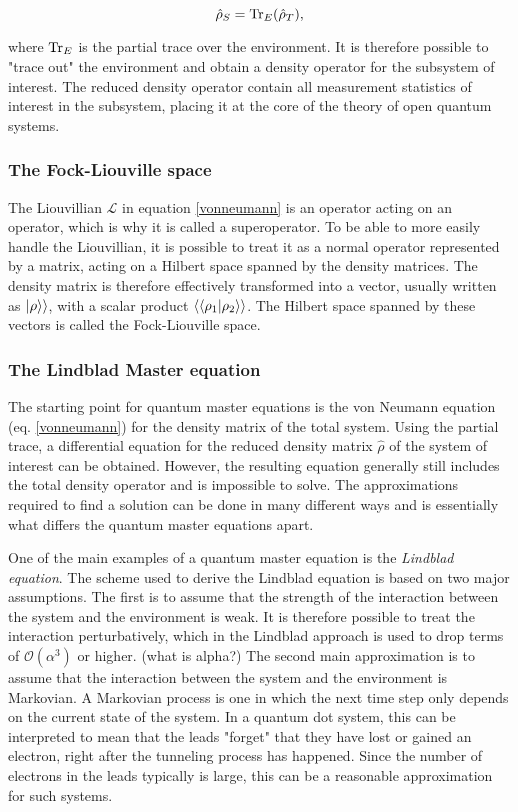 \documentclass[../main.tex]{subfiles}
\begin{document}
\begin{equation}
    \hat\rho_S = \operatorname{Tr}_E({\hat\rho_T}),
\end{equation}

where $\operatorname{Tr}_E$ is the partial trace over the environment. It is therefore possible to "trace out" the environment and obtain a density operator for the subsystem of interest. The reduced density operator contain all measurement statistics of interest in the subsystem, placing it at the core of the theory of open quantum systems.

\subsubsection{The Fock-Liouville space}
The Liouvillian $\mathcal{L}$ in equation \ref{vonneumann} is an operator acting on an operator, which is why it is called a superoperator. To be able to more easily handle the Liouvillian, it is possible to treat it as a normal operator represented by a matrix, acting on a Hilbert space spanned by the density matrices. The density matrix is therefore effectively transformed into a vector, usually written as $\ket{\rho}\rangle$, with a scalar product $\langle\braket{\rho_1|\rho_2}\rangle$. The Hilbert space spanned by these vectors is called the Fock-Liouville space.

\subsubsection{The Lindblad Master equation}\label{sec:lind}
The starting point for quantum master equations is the von Neumann equation (eq. \ref{vonneumann}) for the density matrix of the total system. Using the partial trace, a differential equation for the reduced density matrix $\hat\rho$ of the system of interest can be obtained. However, the resulting equation generally still includes the total density operator and is impossible to solve. The approximations required to find a solution can be done in many different ways and is essentially what differs the quantum master equations apart.

One of the main examples of a quantum master equation is the \textit{Lindblad equation}. The scheme used to derive the Lindblad equation is based on two major assumptions. The first is to assume that the strength of the interaction between the system and the environment is weak. It is therefore possible to treat the interaction perturbatively, which in the Lindblad approach is used to drop terms of $\mathcal{O}(\alpha^3)$ or higher. (what is alpha?) The second main approximation is to assume that the interaction between the system and the environment is Markovian. A Markovian process is one in which the next time step only depends on the current state of the system. In a quantum dot system, this can be interpreted to mean that the leads "forget" that they have lost or gained an electron, right after the tunneling process has happened. Since the number of electrons in the leads typically is large, this can be a reasonable approximation for such systems. 
\end{document}
